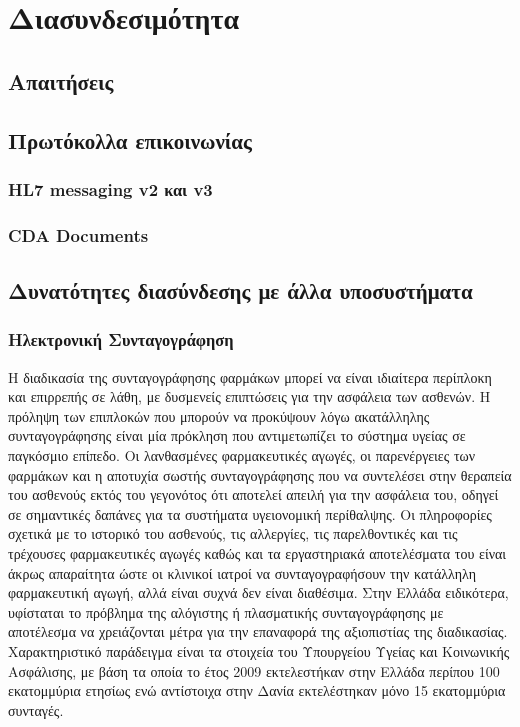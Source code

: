 \chapter{Διασυνδεσιμότητα}\label{ch:Interoperability}
\section{Απαιτήσεις}

\section{Πρωτόκολλα επικοινωνίας}
	\subsection{HL7 messaging v2 και v3}

	\subsection{CDA Documents}
	

		
\section{Δυνατότητες διασύνδεσης με άλλα υποσυστήματα}
	\subsection{Ηλεκτρονική Συνταγογράφηση}
	
		Η διαδικασία της συνταγογράφησης φαρμάκων μπορεί να είναι ιδιαίτερα περίπλοκη και επιρρεπής σε λάθη, με
δυσμενείς επιπτώσεις για την ασφάλεια των ασθενών. Η πρόληψη των επιπλοκών που μπορούν να προκύψουν λόγω ακατάλληλης συνταγογράφησης είναι μία πρόκληση που αντιμετωπίζει το σύστημα υγείας σε παγκόσμιο επίπεδο. Οι λανθασμένες φαρμακευτικές αγωγές, οι παρενέργειες των φαρμάκων και η αποτυχία σωστής συνταγογράφησης που να συντελέσει στην θεραπεία του ασθενούς εκτός του γεγονότος ότι αποτελεί απειλή για την ασφάλεια του, οδηγεί σε σημαντικές δαπάνες για τα συστήματα υγειονομική περίθαλψης. Οι πληροφορίες σχετικά με το ιστορικό του ασθενούς, τις αλλεργίες, τις παρελθοντικές και τις τρέχουσες φαρμακευτικές αγωγές καθώς και τα εργαστηριακά αποτελέσματα του είναι άκρως απαραίτητα ώστε οι κλινικοί ιατροί να συνταγογραφήσουν την κατάλληλη φαρμακευτική αγωγή, αλλά είναι συχνά δεν είναι διαθέσιμα. \cite{prescribingErrors} Στην Ελλάδα ειδικότερα, υφίσταται το πρόβλημα της αλόγιστης ή πλασματικής συνταγογράφησης με αποτέλεσμα να  χρειάζονται μέτρα για την επαναφορά της αξιοπιστίας της διαδικασίας.  Χαρακτηριστικό παράδειγμα είναι τα στοιχεία του Υπουργείου Υγείας και Κοινωνικής Ασφάλισης, με βάση τα οποία το έτος 2009 εκτελεστήκαν στην Ελλάδα περίπου 100 εκατομμύρια ετησίως ενώ αντίστοιχα στην Δανία εκτελέστηκαν μόνο 15 εκατομμύρια συνταγές.


